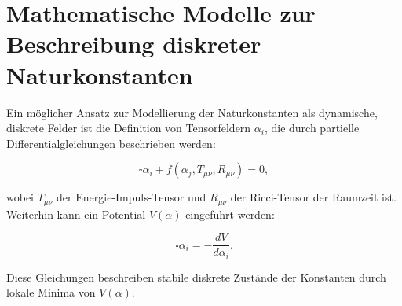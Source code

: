 \documentclass{article}
\begin{document}
	\section{Mathematische Modelle zur Beschreibung diskreter Naturkonstanten}
	
	Ein m\"oglicher Ansatz zur Modellierung der Naturkonstanten als dynamische, diskrete Felder ist die Definition von Tensorfeldern \( \alpha_i \), die durch partielle Differentialgleichungen beschrieben werden:
	
	\begin{equation}
		\square \alpha_i + f(\alpha_j, T_{\mu\nu}, R_{\mu\nu}) = 0,
	\end{equation}
	
	wobei \( T_{\mu\nu} \) der Energie-Impuls-Tensor und \( R_{\mu\nu} \) der Ricci-Tensor der Raumzeit ist. Weiterhin kann ein Potential \( V(\alpha) \) eingef\"uhrt werden:
	
	\begin{equation}
		\square \alpha_i = - \frac{dV}{d\alpha_i}.
	\end{equation}
	
	Diese Gleichungen beschreiben stabile diskrete Zust\"ande der Konstanten durch lokale Minima von \( V(\alpha) \).
	
\end{document}
